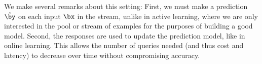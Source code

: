 We make several remarks about this setting:
First, we must make a prediction $\hat \by$ on each input $\bx$ in the stream,
unlike in active learning, where we are only interested in the pool or stream of examples
for the purposes of building a good model.
Second, the responses are used to update the prediction model, like in online learning.
This allows the number of queries needed (and thus cost and latency) to decrease over time
without compromising accuracy.
